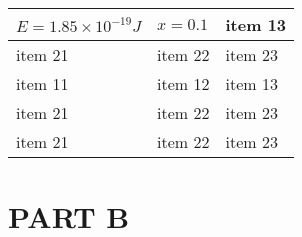 \documentclass{article}
\begin{document}
\begin{center}
\begin{tabularx}{0.8\textwidth} { 
		| >{\raggedright\arraybackslash}X 
		| >{\centering\arraybackslash}X 
		| >{\raggedleft\arraybackslash}X | }
	\hline
	$E=1.85\times10^{-19}J$ & $x=0.1$ & item 13 \\
	\hline
	item 21  & item 22  & item 23  \\
	\hline
	item 11 & item 12 & item 13 \\
	\hline
	item 21  & item 22  & item 23  \\
	\hline
	item 21  & item 22  & item 23  \\
	\hline
\end{tabularx}
\end{center}























\section{PART B} 
\end{document}
